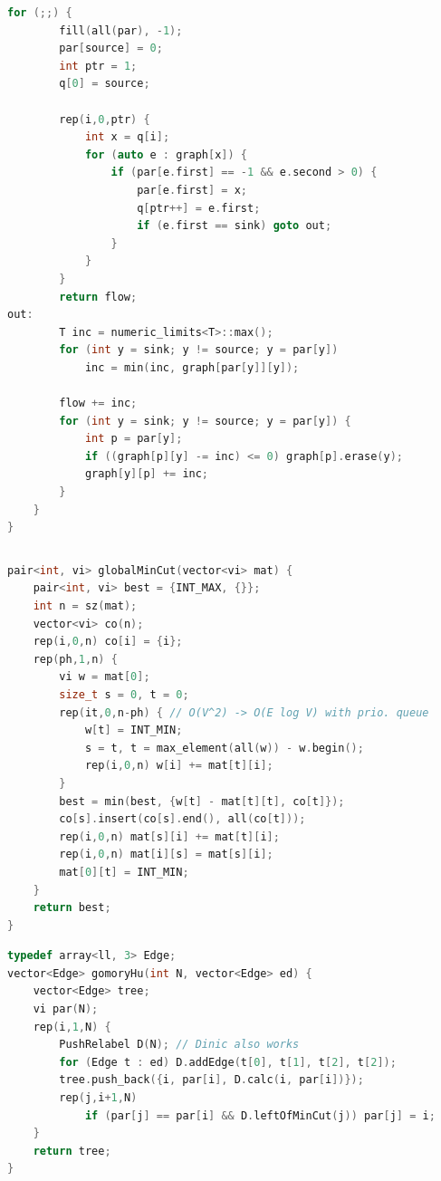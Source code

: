 \begin{multicols}{\Columns}
\begin{lstlisting}[language=C++]
	for (;;) {
		fill(all(par), -1);
		par[source] = 0;
		int ptr = 1;
		q[0] = source;

		rep(i,0,ptr) {
			int x = q[i];
			for (auto e : graph[x]) {
				if (par[e.first] == -1 && e.second > 0) {
					par[e.first] = x;
					q[ptr++] = e.first;
					if (e.first == sink) goto out;
				}
			}
		}
		return flow;
out:
		T inc = numeric_limits<T>::max();
		for (int y = sink; y != source; y = par[y])
			inc = min(inc, graph[par[y]][y]);

		flow += inc;
		for (int y = sink; y != source; y = par[y]) {
			int p = par[y];
			if ((graph[p][y] -= inc) <= 0) graph[p].erase(y);
			graph[y][p] += inc;
		}
	}
}
\end{lstlisting}

\begin{lstlisting}[language=C++]

\end{lstlisting}

\begin{lstlisting}[language=C++]
pair<int, vi> globalMinCut(vector<vi> mat) {
	pair<int, vi> best = {INT_MAX, {}};
	int n = sz(mat);
	vector<vi> co(n);
	rep(i,0,n) co[i] = {i};
	rep(ph,1,n) {
		vi w = mat[0];
		size_t s = 0, t = 0;
		rep(it,0,n-ph) { // O(V^2) -> O(E log V) with prio. queue
			w[t] = INT_MIN;
			s = t, t = max_element(all(w)) - w.begin();
			rep(i,0,n) w[i] += mat[t][i];
		}
		best = min(best, {w[t] - mat[t][t], co[t]});
		co[s].insert(co[s].end(), all(co[t]));
		rep(i,0,n) mat[s][i] += mat[t][i];
		rep(i,0,n) mat[i][s] = mat[s][i];
		mat[0][t] = INT_MIN;
	}
	return best;
}
\end{lstlisting}

\begin{lstlisting}[language=C++]
typedef array<ll, 3> Edge;
vector<Edge> gomoryHu(int N, vector<Edge> ed) {
	vector<Edge> tree;
	vi par(N);
	rep(i,1,N) {
		PushRelabel D(N); // Dinic also works
		for (Edge t : ed) D.addEdge(t[0], t[1], t[2], t[2]);
		tree.push_back({i, par[i], D.calc(i, par[i])});
		rep(j,i+1,N)
			if (par[j] == par[i] && D.leftOfMinCut(j)) par[j] = i;
	}
	return tree;
}
\end{lstlisting}



\end{multicols}
